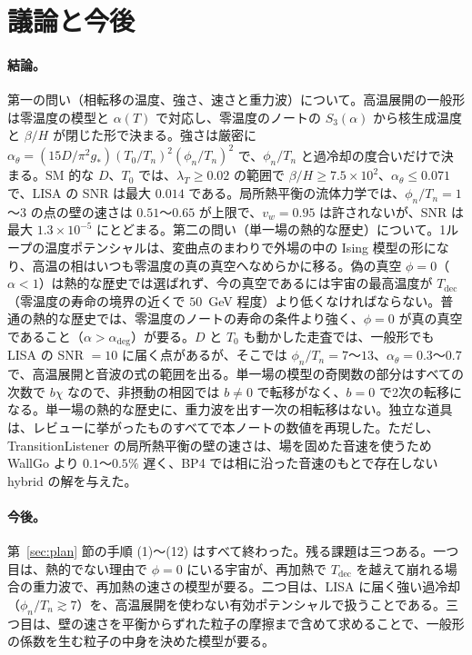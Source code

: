 \documentclass[a4paper,10pt]{ltjsarticle}
\begin{document}
\FloatBarrier
\section{議論と今後}\label{sec:discussion}

\paragraph{結論。}第一の問い（相転移の温度、強さ、速さと重力波）について。高温展開の一般形は零温度の模型と $\alpha(T)$ で対応し、零温度のノートの $S_3(\alpha)$ から核生成温度と $\beta/H$ が閉じた形で決まる。強さは厳密に $\alpha_\theta=(15D/\pi^2g_*)(T_0/T_n)^2(\phi_n/T_n)^2$ で、$\phi_n/T_n$ と過冷却の度合いだけで決まる。SM 的な $D$、$T_0$ では、$\lambda_T\ge0.02$ の範囲で $\beta/H\ge7.5\times10^2$、$\alpha_\theta\le0.071$ で、LISA の SNR は最大 $0.014$ である。局所熱平衡の流体力学では、$\phi_n/T_n=1$〜$3$ の点の壁の速さは $0.51$〜$0.65$ が上限で、$v_w=0.95$ は許されないが、SNR は最大 $1.3\times10^{-5}$ にとどまる。第二の問い（単一場の熱的な歴史）について。1ループの温度ポテンシャルは、変曲点のまわりで外場の中の Ising 模型の形になり、高温の相はいつも零温度の真の真空へなめらかに移る。偽の真空 $\phi=0$（$\alpha<1$）は熱的な歴史では選ばれず、今の真空であるには宇宙の最高温度が $T_{\mathrm{dec}}$（零温度の寿命の境界の近くで $50$~GeV 程度）より低くなければならない。普通の熱的な歴史では、零温度のノートの寿命の条件より強く、$\phi=0$ が真の真空であること（$\alpha>\alpha_{\mathrm{deg}}$）が要る。$D$ と $T_0$ も動かした走査では、一般形でも LISA の SNR $=10$ に届く点があるが、そこでは $\phi_n/T_n=7$〜$13$、$\alpha_\theta=0.3$〜$0.7$ で、高温展開と音波の式の範囲を出る。単一場の模型の奇関数の部分はすべての次数で $b\chi$ なので、非摂動の相図では $b\ne0$ で転移がなく、$b=0$ で2次の転移になる。単一場の熱的な歴史に、重力波を出す一次の相転移はない。独立な道具は、レビューに挙がったものすべてで本ノートの数値を再現した。ただし、TransitionListener の局所熱平衡の壁の速さは、場を固めた音速を使うため WallGo より $0.1$〜$0.5\%$ 遅く、BP4 では相に沿った音速のもとで存在しない hybrid の解を与えた。

\paragraph{今後。}第~\ref{sec:plan} 節の手順 (1)〜(12) はすべて終わった。残る課題は三つある。一つ目は、熱的でない理由で $\phi=0$ にいる宇宙が、再加熱で $T_{\mathrm{dec}}$ を越えて崩れる場合の重力波で、再加熱の速さの模型が要る。二つ目は、LISA に届く強い過冷却（$\phi_n/T_n\gtrsim7$）を、高温展開を使わない有効ポテンシャルで扱うことである。三つ目は、壁の速さを平衡からずれた粒子の摩擦まで含めて求めることで、一般形の係数を生む粒子の中身を決めた模型が要る。
\end{document}
